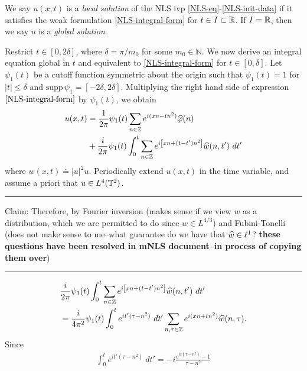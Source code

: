 \begin{definition}
	We say $u(x,t)$ is a \emph{local solution} of the NLS ivp
\eqref{NLS-eq}-\eqref{NLS-init-data} if it satisfies the weak formulation 
\eqref{NLS-integral-form} for $t \in I \subset \mathbb{R}$. If $I = \mathbb{R}$, then we say 
$u$ is a \emph{global solution}. 
%
%
\end{definition}
%
%
Restrict $t \in [0, 2\delta]$, where $\delta = \pi/m_0$ for some $m_0 \in 
\mathbb{N}$. We now derive an integral 
equation global in $t$ and equivalent to \eqref{NLS-integral-form} for $t 
\in [0, \delta]$. Let $\psi_1(t)$ be a cutoff function symmetric about the 
origin such that $\psi_1(t) = 1$ for $|t| \le \delta$ and $\text{supp} \, \psi_1 
= 
[-2\delta, 2\delta ]$. Multiplying the right hand side of expression 
$\eqref{NLS-integral-form}$ by $\psi_1(t)$, we obtain
%
%
\begin{equation}
	\begin{split}
		\label{cutoff-int-eq}
		u(x, t)
		& = \frac{1}{2 \pi} \psi_1(t) \sum_{n \in \mathbb{Z}} e^{i(xn - tn^{2
		})} \widehat{\varphi}(n) 
		\\
		& + \frac{i }{2 \pi} \psi_1(t) \int_0^t \sum_{n \in \mathbb{Z}} 
		e^{i\left[ xn + (t - t')n^2 \right]} \widehat{w}(n, t') \ dt'
	\end{split}
\end{equation}
%
%
where $w(x, t) \doteq |u|^2 u$. Periodically extend $u(x, t)$ in the time 
variable, and assume a priori that $u \in 
L^4(\mathbb{T}^2)$. 
\\
\hrule
Claim: Therefore, by Fourier inversion (makes sense if we view $w$ as a 
distribution, which we are permitted to do since $w \in L^{4/3}$) and 
Fubini-Tonelli (does not make sense to me--what guarantee 
do we have that $\widehat{w} \in \ell^1$? \textbf{these questions have been resolved 
in mNLS document--in process of copying them over})
\\
\hrule
%
\begin{equation}
	\label{prim-int-form}
	\begin{split}
		& \frac{i }{2 \pi} \psi_1(t) \int_0^t \sum_{n \in \mathbb{Z}} 
		e^{i\left[ xn + (t - t')n^2 \right]} \widehat{w}(n, t') \ dt'
		\\
		& = \frac{i }{4 \pi^2} \psi_1(t)
		\int_0^t 
		e^{it'(\tau - n^2)} \ dt' 
		\sum_{n, \tau \in \mathbb{Z}} e^{i(xn + tn^2)} \widehat{w}(n, \tau) .
	\end{split}
\end{equation}
Since
%
%
\begin{equation*}
	\begin{split}
		\int_0^t e^{it'(\tau - n^2)} \ dt' = -i \frac{e^{it(\tau - n^{2  
		})}- 1}{\tau - n^2}
	\end{split}
\end{equation*}
